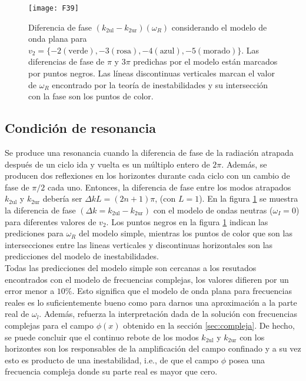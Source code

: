 \begin{figure}\centering
	\texttt{[image: F39]}
	\caption{Diferencia de fase $(k_{\text{2ul}}-k_{\text{2ur}})(\omega_R)$ considerando el modelo de onda plana para $v_2=\{-2(\text{verde}), -3(\text{rosa}), -4 (\text{azul}),-5(\text{morado})\}$. Las diferencias de fase de $\pi$ y $3\pi$ predichas por el modelo están marcados por puntos negros. Las líneas discontinuas verticales marcan el valor de $\omega_R$ encontrado por la teoría de inestabilidades y su intersección con la fase son los puntos de color.}\label{fig:3.9}
\end{figure}

\subsection{Condici\'{o}n de resonancia}
Se produce una resonancia cuando la diferencia de fase de la radiación atrapada después de un ciclo ida y vuelta es un múltiplo entero de $2\pi$. Además, se producen dos reflexiones en los horizontes durante cada ciclo con un cambio de fase de $\pi/2$ cada uno. Entonces, la diferencia de fase entre los modos atrapados $ k_{\text{2ul}}$ y $k_{\text{2ur}}$ debería ser
$\Delta k L=(2n+1)\pi$, (con $L=1$). En la figura \ref{fig:3.9} se muestra la diferencia de fase $(\Delta k =k_{\text{2ul}} - k_{\text{2ur}})$ con el modelo de ondas neutras ($\omega_I=0$) para diferentes valores de $v_2$. Los puntos negros en la figura \ref{fig:3.9} indican las prediciones para $\omega_R$ del modelo simple, mientras los puntos de color que son las intersecciones entre las lineas verticales y discontinuas horizontales son las predicciones del modelo de inestabilidades.\\
Todas las predicciones del modelo simple son cercanas a los resutados encontrados con el modelo de frecuencias complejas, los valores difieren por un error menor a $10\%$. Esto significa que el modelo de onda plana para frecuencias reales es lo suficientemente bueno como para darnos una aproximación a la parte real de $\omega_l$. Además, refuerza la interpretación dada de la solución  con frecuencias complejas para el campo $\phi(x)$ obtenido en la secci\'{o}n \ref{sec:compleja}. De hecho, se puede concluir que el continuo rebote de los modos $k_{\text{2ul}}$ y $k_{\text{2ur}}$ con los horizontes son los responsables de la amplificaci\'{o}n del campo confinado y a su vez esto es producto de una inestabilidad, i.e., de que el campo $\phi$ posea una frecuencia compleja donde su parte real es mayor que cero.\\

